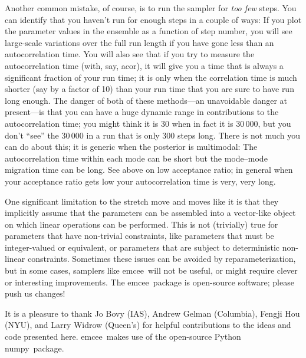 \documentclass[12pt,preprint]{aastex}
\newcommand{\project}[1]{{\sffamily #1}}
\newcommand{\numpy}{\project{numpy}}
\newcommand{\acor}{\project{acor}}
\newcommand{\thisplain}{emcee}
\newcommand{\this}{\project{\thisplain}}
\begin{document}
Another common mistake, of course, is to run the sampler for \emph{too
  few} steps.  You can identify that you haven't run for enough steps
in a couple of ways: If you plot the parameter values in the ensemble
as a function of step number, you will see large-scale variations over
the full run length if you have gone less than an autocorrelation
time.  You will also see that if you try to measure the
autocorrelation time (with, say, \acor), it will give you a time that
is always a significant fraction of your run time; it is only when the
correlation time is much shorter (say by a factor of 10) than your run
time that you are sure to have run long enough.  The danger of both of
these methods---an unavoidable danger at present---is that you can
have a huge dynamic range in contributions to the autocorrelation
time; you might think it is 30 when in fact it is 30\,000, but you
don't ``see'' the 30\,000 in a run that is only 300 steps long.  There
is not much you can do about this; it is generic when the posterior is
multimodal: The autocorrelation time within each mode can be short but
the mode--mode migration time can be long.  See above on low
acceptance ratio; in general when your acceptance ratio gets low your
autocorrelation time is very, very long.

One significant limitation to the stretch move and moves like it is
that they implicitly assume that the parameters can be assembled into
a vector-like object on which linear operations can be performed.
This is not (trivially) true for parameters that have non-trivial
constraints, like parameters that must be integer-valued or
equivalent, or parameters that are subject to deterministic non-linear
constraints.  Sometimes these issues can be avoided by
reparameterization, but in some cases, samplers like \this\ will not
be useful, or might require clever or interesting improvements.  The
\this\ package is open-source software; please push us changes!

\acknowledgments It is a pleasure to thank Jo Bovy (IAS), Andrew
Gelman (Columbia), Fengji Hou (NYU), and Larry Widrow (Queen's) for
helpful contributions to the ideas and code presented here.
\this\ makes use of the open-source Python \numpy\ package.

\nonumberparagraphs
\end{document}
